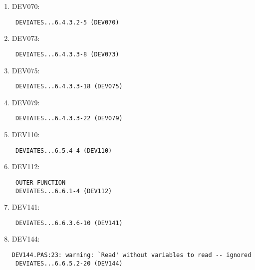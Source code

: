 \documentclass[a4paper]{article}
\begin{document}
\begin{enumerate}
    \item DEV070: 
        \begin{small}\begin{verbatim}
 DEVIATES...6.4.3.2-5 (DEV070)
        \end{verbatim}\end{small}

    \item DEV073: 
        \begin{small}\begin{verbatim}
 DEVIATES...6.4.3.3-8 (DEV073)
        \end{verbatim}\end{small}

    \item DEV075: 
        \begin{small}\begin{verbatim}
 DEVIATES...6.4.3.3-18 (DEV075)
        \end{verbatim}\end{small}

    \item DEV079: 
        \begin{small}\begin{verbatim}
 DEVIATES...6.4.3.3-22 (DEV079)
        \end{verbatim}\end{small}

    \item DEV110: 
        \begin{small}\begin{verbatim}
 DEVIATES...6.5.4-4 (DEV110)
        \end{verbatim}\end{small}

    \item DEV112: 
        \begin{small}\begin{verbatim}
 OUTER FUNCTION
 DEVIATES...6.6.1-4 (DEV112)
        \end{verbatim}\end{small}

    \item DEV141: 
        \begin{small}\begin{verbatim}
 DEVIATES...6.6.3.6-10 (DEV141)
        \end{verbatim}\end{small}

    \item DEV144: 
        \begin{small}\begin{verbatim}
DEV144.PAS:23: warning: `Read' without variables to read -- ignored
 DEVIATES...6.6.5.2-20 (DEV144)
        \end{verbatim}\end{small}


\end{enumerate}
\end{document}
